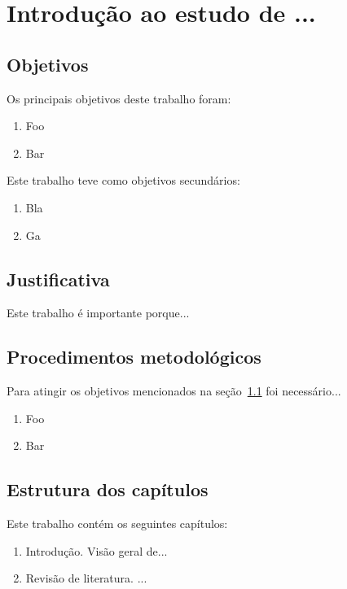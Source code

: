 
\chapter{Introdução ao estudo de ...}
\label{chap:introducao}


\section{Objetivos}
\label{sec:objetivos}

Os principais objetivos deste trabalho foram:

\begin{enumerate}
\item Foo
\item Bar
\end{enumerate}

Este trabalho teve como objetivos secundários:

\begin{enumerate}
\item Bla
\item Ga
\end{enumerate}

\section{Justificativa}
\label{sec:justificativa}

Este trabalho é importante porque...

\section{Procedimentos metodológicos}
\label{sec:metodologia}

Para atingir os objetivos mencionados na seção~\ref{sec:objetivos} foi
necessário...

\begin{enumerate}
\item Foo
\item Bar
\end{enumerate}

\section{Estrutura dos capítulos}
\label{sec:estrutura-capitulos}

Este trabalho contém os seguintes capítulos:

\begin{enumerate}
\item Introdução. Visão geral de...
\item Revisão de literatura. ...
\end{enumerate}

